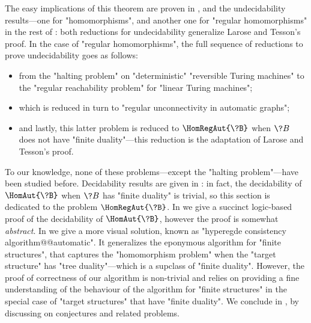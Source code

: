 The easy implications of this theorem are proven in ,
and the undecidability results---one for "homomorphisms", and another one for "regular homomorphisms" in the rest of :
both reductions for undecidability generalize Larose and Tesson's proof.
In the case of "regular homomorphisms", the full sequence of reductions
to prove undecidability goes as follows:
\begin{itemize}
	\item from the "halting problem" on "deterministic" "reversible Turing machines"
		to the "regular reachability problem" for "linear Turing machines";
	\item which is reduced in turn to "regular unconnectivity in automatic graphs";
	\item and lastly, this latter problem is reduced
		to $\HomRegAut{\?B}$ when $\?B$ does not have "finite duality"---this
		reduction is the adaptation of Larose and Tesson's proof.
\end{itemize}
To our knowledge, none of these problems---except the "halting problem"---have been studied before.
Decidability results are given in :
in fact, the decidability of $\HomAut{\?B}$ when $\?B$ has "finite duality"
is trivial, so this section is dedicated to the problem $\HomRegAut{\?B}$.
In  we give a succinct
logic-based proof of the decidability of $\HomAut{\?B}$, however the proof is
somewhat \emph{abstract}. In  we give a more visual solution,
known as "hyperegde consistency algorithm@@automatic". It generalizes
the eponymous algorithm for "finite structures", that captures
the "homomorphism problem" when the "target structure" has "tree duality"---which is
a supclass of "finite duality".
However, the proof of correctness of our algorithm is non-trivial
and relies on providing a fine understanding of the behaviour of the algorithm
for "finite structures" in the special case of "target structures"
that have "finite duality".
We conclude in , by discussing on
conjectures and related problems.

